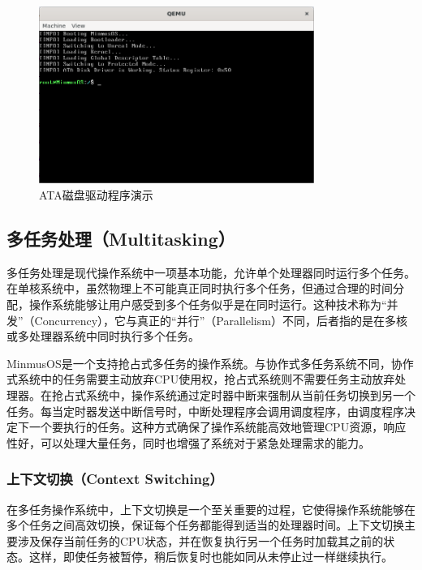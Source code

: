 \begin{figure}[htbp]
    \centering
    \includegraphics[width=0.8\textwidth]{figures/ATADiskDriverPresentation.png}
    \caption{ATA磁盘驱动程序演示}
    \label{fig:ATADiskDriverPresentation}
\end{figure}

\subsection{多任务处理（Multitasking）}

多任务处理是现代操作系统中一项基本功能，允许单个处理器同时运行多个任务。在单核系统中，虽然物理上不可能真正同时执行多个任务，但通过合理的时间分配，操作系统能够让用户感受到多个任务似乎是在同时运行。这种技术称为“并发”（Concurrency），它与真正的“并行”（Parallelism）不同，后者指的是在多核或多处理器系统中同时执行多个任务。

MinmusOS是一个支持抢占式多任务的操作系统。与协作式多任务系统不同，协作式系统中的任务需要主动放弃CPU使用权，抢占式系统则不需要任务主动放弃处理器。在抢占式系统中，操作系统通过定时器中断来强制从当前任务切换到另一个任务。每当定时器发送中断信号时，中断处理程序会调用调度程序，由调度程序决定下一个要执行的任务。这种方式确保了操作系统能高效地管理CPU资源，响应性好，可以处理大量任务，同时也增强了系统对于紧急处理需求的能力。

\subsubsection{上下文切换（Context Switching）}

在多任务操作系统中，上下文切换是一个至关重要的过程，它使得操作系统能够在多个任务之间高效切换，保证每个任务都能得到适当的处理器时间。上下文切换主要涉及保存当前任务的CPU状态，并在恢复执行另一个任务时加载其之前的状态。这样，即使任务被暂停，稍后恢复时也能如同从未停止过一样继续执行。

